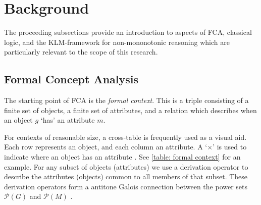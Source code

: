 \section{Background}
\label{section: background}

The proceeding subsections provide an introduction to aspects of FCA, classical logic, and the KLM-framework for non-mononotonic reasoning which are particularly relevant to the scope of this research.

\subsection{Formal Concept Analysis}
\label{subsection: formal concept analysis}

The starting point of FCA is the \textit{formal context}. This is a triple consisting of a finite set of objects, a finite set of attributes, and a relation which describes when an object $g$ `has' an attribute $m$.
%
%
For contexts of reasonable size, a cross-table is frequently used as a visual aid. Each row represents an object, and each column an attribute. A `$\times$' is used to indicate where an object has an attribute \cite{ganter1999formal,ganter2016conceptual}. See \autoref{table: formal context} for an example.
For any subset of objects (attributes) we use a derivation operator to describe the attributes (objects) common to all members of that subset. These derivation operators form a antitone Galois connection between the power sets $\mathcal{P}(G)$ and $\mathcal{P}(M)$ \cite{ganter1999formal}.
%
